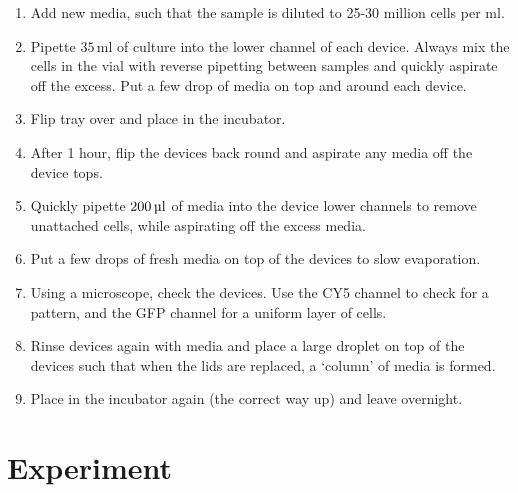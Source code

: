 \begin{enumerate}
	\item Add new media, such that the sample is diluted to 25-30 million cells per ml.
	\item Pipette $35 \, \text{ml}$ of culture into the lower channel of each device. Always mix the cells in the vial with reverse pipetting between samples and quickly aspirate off the excess. Put a few drop of media on top and around each device.
	\item Flip tray over and place in the incubator.
	\item After 1 hour, flip the devices back round and aspirate any media off the device tops.
	\item Quickly pipette $200 \, \text{\textmu l}$ of media into the device lower channels to remove unattached cells, while aspirating off the excess media.
	\item Put a few drops of fresh media on top of the devices to slow evaporation.
	\item Using a microscope, check the devices. Use the CY5 channel to check for a pattern, and the GFP channel for a uniform layer of cells.
	\item Rinse devices again with media and place a large droplet on top of the devices such that when the lids are replaced, a `column' of media is formed.
	\item Place in the incubator again (the correct way up) and leave overnight.
\end{enumerate}

\section{Experiment}

